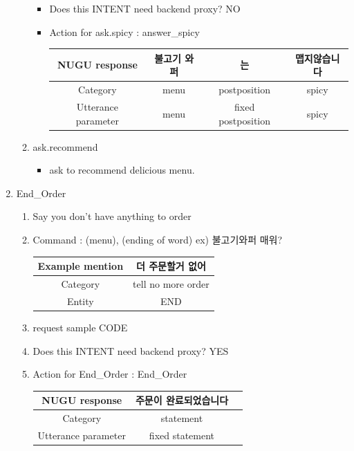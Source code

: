 \documentclass[conference,compsoc]{IEEEtran}
\begin{document}
\begin{enumerate}
\begin{enumerate}
\begin{itemize}
      \item Does this INTENT need backend proxy? NO
      \item Action for ask.spicy : answer\_spicy
      \begin{table}[ht!] \renewcommand\arraystretch{1.25}
        \centering
          \begin{tabular}{@{}c | c c c @{}}
          \hline
          NUGU response & 불고기 와퍼 & 는  & 맵지않습니다 \\ 
          \hline
          Category        & menu   & postposition & spicy \\ 
          \hline
          Utterance parameter  & {{menu}}   & fixed postposition & {{spicy}} \\
          \hline
          \end{tabular}
      \end{table} 
      
    \end{itemize}

    \item ask.recommend
    \begin{itemize}
      \item ask to recommend delicious menu.
    \end{itemize}
  \end{enumerate}

  \item End\_Order
  \begin{enumerate}
    \item Say you don’t have anything to order
    \item Command : (menu), (ending of word) ex) 불고기와퍼 매워? 
    \begin{table}[ht!] \renewcommand\arraystretch{1.25}
      \centering
        \begin{tabular}{@{}c | c  @{}}
        \hline
        Example mention & 더 주문할거 없어 \\ 
        \hline
        Category        & tell no more order \\ 
        \hline
        Entity  & END \\
        \hline
        \end{tabular}
    \end{table} 

    \item request sample
    CODE
    \item Does this INTENT need backend proxy? YES
    \item Action for End\_Order : End\_Order
    \begin{table}[ht!] \renewcommand\arraystretch{1.25}
      \centering
        \begin{tabular}{@{}c | c c @{}}
        \hline
        NUGU response & 주문이 완료되었습니다 \\ 
        \hline
        Category        & statement \\ 
        \hline
        Utterance parameter  & fixed statement \\
        \hline
        \end{tabular}
    \end{table} 


\end{enumerate}
\end{enumerate}
\end{document}
